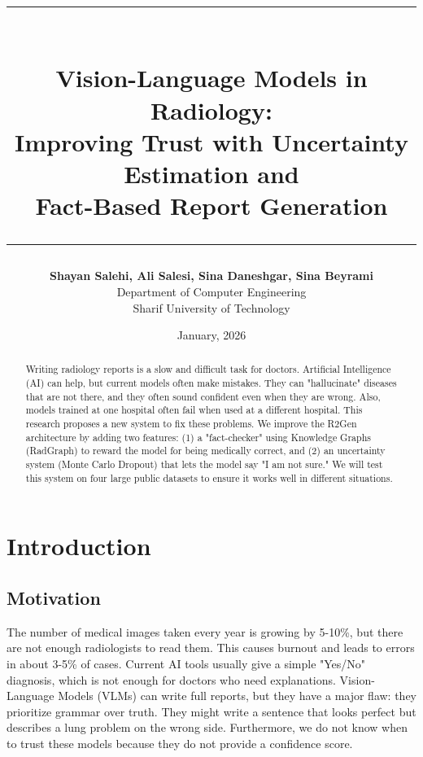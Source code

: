 \documentclass[11pt,a4paper]{article}
\title{
    \vspace{-1cm}
    \rule{\linewidth}{0.5mm}\\[0.4cm]
    \textbf{\huge Vision-Language Models in Radiology:}\\[0.2cm]
    \Large \textbf{Improving Trust with Uncertainty Estimation and \\Fact-Based Report Generation}\\[0.4cm]
    \rule{\linewidth}{0.5mm}
}
\author{
    \textbf{Shayan Salehi, Ali Salesi, Sina Daneshgar, Sina Beyrami}\\
    Department of Computer Engineering\\
    Sharif University of Technology\\
}
\date{January, 2026}
\begin{document}
\maketitle

\begin{abstract}
Writing radiology reports is a slow and difficult task for doctors. Artificial Intelligence (AI) can help, but current models often make mistakes. They can "hallucinate" diseases that are not there, and they often sound confident even when they are wrong. Also, models trained at one hospital often fail when used at a different hospital. This research proposes a new system to fix these problems. We improve the R2Gen architecture by adding two features: (1) a "fact-checker" using Knowledge Graphs (RadGraph) to reward the model for being medically correct, and (2) an uncertainty system (Monte Carlo Dropout) that lets the model say "I am not sure." We will test this system on four large public datasets to ensure it works well in different situations.
\end{abstract}

\section{Introduction}

\subsection{Motivation}
The number of medical images taken every year is growing by 5-10\%, but there are not enough radiologists to read them. This causes burnout and leads to errors in about 3-5\% of cases. Current AI tools usually give a simple "Yes/No" diagnosis, which is not enough for doctors who need explanations. Vision-Language Models (VLMs) can write full reports, but they have a major flaw: they prioritize grammar over truth. They might write a sentence that looks perfect but describes a lung problem on the wrong side. Furthermore, we do not know when to trust these models because they do not provide a confidence score.
\end{document}
